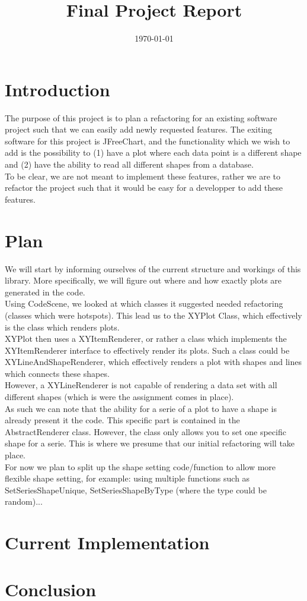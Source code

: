 \documentclass{article}
\title{\textmd{\textbf{Final Project Report}}\\\normalsize\vspace{0.1in}\Large{\projectnaam}}
\author{\student}\date{\today}
\begin{document}
\maketitle
\newpage

\section{Introduction}

The purpose of this project is to plan a refactoring for an existing software project such that we can easily add newly requested features.
The exiting software for this project is JFreeChart, and the functionality which we wish to add is the possibility to (1) have a plot where each data point is a different shape and (2) have the ability to read all different shapes from a database.\\

To be clear, we are not meant to implement these features, rather we are to refactor the project such that it would be easy for a developper to add these features.

\section{Plan}

We will start by informing ourselves of the current structure and workings of this library. More specifically, we will figure out where and how exactly plots are generated in the code.\\

Using CodeScene, we looked at which classes it suggested needed refactoring (classes which were hotspots). This lead us to the XYPlot Class, which effectively is the class which renders plots.\\

XYPlot then uses a XYItemRenderer, or rather a class which implements the XYItemRenderer interface to effectively render its plots. Such a class could be XYLineAndShapeRenderer, which effectively renders a plot with shapes and lines which connects these shapes.\\

However, a XYLineRenderer is not capable of rendering a data set with all different shapes (which is were the assignment comes in place).\\

As such we can note that the ability for a serie of a plot to have a shape is already present it the code. This specific part is contained in the AbstractRenderer class. However, the class only allows you to set one specific shape for a serie. This is where we presume that our initial refactoring will take place.\\

For now we plan to split up the shape setting code/function to allow more flexible shape setting, for example: using multiple functions such as SetSeriesShapeUnique, SetSeriesShapeByType (where the type could be random)...


\section{Current Implementation}


\newpage
\section{Conclusion}
\end{document}
